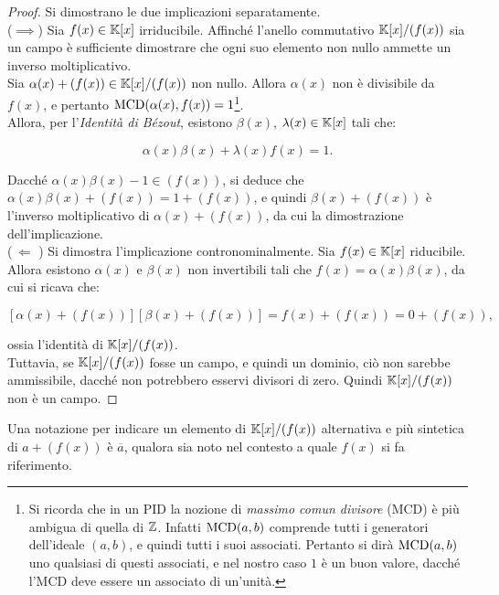 \documentclass[11pt]{scrbook}
\begin{document}
\begin{proof}
    Si dimostrano le due implicazioni separatamente. \\

    ($\implies$)\; Sia $f(x) \in \mathbb{K}[x]$ irriducibile. Affinché l'anello
    commutativo $\mathbb{K}[x]/(f(x))$ sia un campo è sufficiente dimostrare
    che ogni suo elemento non nullo ammette un inverso moltiplicativo. \\

    Sia $\alpha(x) + (f(x)) \in \mathbb{K}[x]/(f(x))$ non nullo. Allora
    $\alpha(x)$ non è divisibile da $f(x)$, e pertanto
    $\operatorname{MCD}(\alpha(x), f(x))=1$\footnote{Si ricorda che in un PID la
        nozione di \textit{massimo comun divisore} (MCD) è più ambigua
        di quella di $\mathbb Z$. Infatti $\operatorname{MCD}(a,b)$ comprende tutti i
        generatori dell'ideale $(a,b)$, e quindi tutti i suoi associati.
        Pertanto si dirà $\operatorname{MCD}(a,b)$ uno qualsiasi di questi associati,
        e nel nostro caso $1$ è un buon valore, dacché l'MCD deve essere
        un associato di un'unità.}. \\

    Allora, per l'\textit{Identità di Bézout}, esistono $\beta(x)$,
    $\lambda(x) \in \mathbb{K}[x]$ tali che:

    \[ \alpha(x)\beta(x) + \lambda(x)f(x) = 1. \]

    Dacché $\alpha(x)\beta(x)-1 \in (f(x))$, si deduce che
    $\alpha(x)\beta(x)+(f(x))=1+(f(x))$, e quindi
    $\beta(x) + (f(x))$ è l'inverso moltiplicativo di $\alpha(x) +
        (f(x))$, da cui la dimostrazione dell'implicazione. \\

    ($\,\Longleftarrow\,\,$)\; Si dimostra l'implicazione
    contronominalmente. Sia $f(x) \in \mathbb{K}[x]$ riducibile. Allora
    esistono $\alpha(x)$ e $\beta(x)$ non
    invertibili tali che $f(x)=\alpha(x)\beta(x)$, da cui si ricava che:

    \[[\alpha(x)+(f(x))][\beta(x)+(f(x))]=f(x)+(f(x))=0+(f(x)),\]

    \vskip 0.1in

    ossia l'identità di $\mathbb{K}[x]/(f(x))$. \\

    Tuttavia, se $\mathbb{K}[x]/(f(x))$ fosse un campo, e quindi un dominio,
    ciò non sarebbe ammissibile, dacché non potrebbero esservi
    divisori di zero. Quindi $\mathbb{K}[x]/(f(x))$ non è un campo.

\end{proof}

\begin{remark*}
    Una notazione per indicare un elemento di $\mathbb{K}[x]/(f(x))$ alternativa
    e più sintetica di $a+(f(x))$ è $\overline{a}$, qualora
    sia noto nel contesto a quale $f(x)$ si fa riferimento.
\end{remark*}
\end{document}

